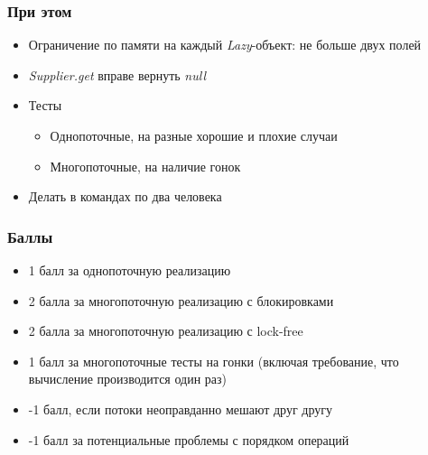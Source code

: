 \documentclass[xetex,mathserif,serif]{beamer}
\begin{document}
	\begin{frame}
		\frametitle{При этом}
		\begin{itemize}
			\item Ограничение по памяти на каждый \textit{Lazy}-объект: не больше двух полей
			\item \textit{Supplier.get} вправе вернуть \textit{null}
			\item Тесты
			\begin{itemize}
				\item Однопоточные, на разные хорошие и плохие случаи
				\item Многопоточные, на наличие гонок
			\end{itemize}
			\item Делать в командах по два человека
		\end{itemize}
	\end{frame}

	\begin{frame}
		\frametitle{Баллы}
		\begin{itemize}
			\item 1 балл за однопоточную реализацию
			\item 2 балла за многопоточную реализацию с блокировками
			\item 2 балла за многопоточную реализацию с lock-free
			\item 1 балл за многопоточные тесты на гонки (включая требование, что вычисление производится один раз)
			\item -1 балл, если потоки неоправданно мешают друг другу
			\item -1 балл за потенциальные проблемы с порядком операций
		\end{itemize}
	\end{frame}
\end{document}
